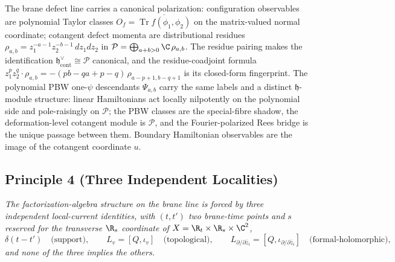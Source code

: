 The brane defect line carries a canonical polarization: configuration
observables are polynomial Taylor classes
\(O_f=\overline{\operatorname{Tr}f(\phi_1,\phi_2)}\) on the
matrix-valued normal coordinate; cotangent defect momenta are
distributional residues
\(\rho_{a,b}=z_1^{-a-1}z_2^{-b-1}\,dz_1dz_2\) in
\(\mathcal P=\bigoplus_{a+b>0}\C\,\rho_{a,b}\).  The residue pairing
makes the identification \(\mathfrak h^\vee_{\mathrm{cont}}\cong
\mathcal P\) canonical, and the residue-coadjoint formula
\(z_1^p z_2^q\cdot\rho_{a,b}=-(pb-qa+p-q)\,\rho_{a-p+1,b-q+1}\) is
its closed-form fingerprint.  The polynomial PBW one-\(\psi\)
descendants \(\Psi_{a,b}\) carry the same labels and a distinct
\(\mathfrak h\)-module structure: linear Hamiltonians act locally
nilpotently on the polynomial side and pole-raisingly on
\(\mathcal P\); the PBW classes are the special-fibre shadow, the
deformation-level cotangent module is \(\mathcal P\), and the
Fourier-polarized Rees bridge is the unique passage between them.
Boundary Hamiltonian observables are the image of the cotangent
coordinate \(u\).

\subsection*{Principle 4 (Three Independent Localities)}

\emph{The factorization-algebra structure on the brane line is forced
by three independent local-current identities, with \((t,t')\) two
brane-time points and \(s\) reserved for the transverse \(\R_s\)
coordinate of \(X=\R_t\times\R_s\times\C^2\),
\[
  \delta(t-t')\quad\text{(support)},\qquad
  L_v=[Q,\iota_v]\quad\text{(topological)},\qquad
  L_{\partial/\partial\bar z_i}
   =[Q,\iota_{\partial/\partial\bar z_i}]
   \quad\text{(formal-holomorphic)},
\]
and none of the three implies the others.}

